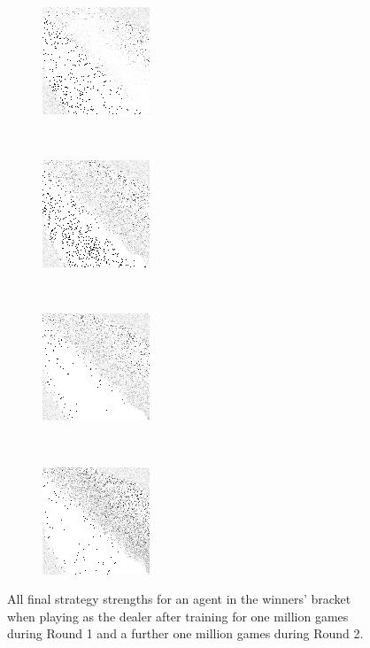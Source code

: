 \begin{figure}
	\begin{subfigure}[t]{0.22\textwidth}
		\includegraphics[width=\stratgraphwidth]{images/findings/round2/strats/winner/crib_min_avg.png}
		\caption{\cribminavg}
	\end{subfigure}
	~
	\begin{subfigure}[t]{0.22\textwidth}
		\includegraphics[width=\stratgraphwidth]{images/findings/round2/strats/winner/pegging_max_avg_gained.png}
		\caption{\peggingmaxavggained}
	\end{subfigure}
	~
	\begin{subfigure}[t]{0.22\textwidth}
		\includegraphics[width=\stratgraphwidth]{images/findings/round2/strats/winner/pegging_max_med_gained.png}
		\caption{\peggingmaxmedgained}
	\end{subfigure}
	~
	\begin{subfigure}[t]{0.22\textwidth}
		\includegraphics[width=\stratgraphwidth]{images/findings/round2/strats/winner/pegging_min_avg_given.png}
		\caption{\peggingminavggiven}
	\end{subfigure}

\caption{
	All final strategy strengths for an agent in the winners' bracket
	when playing as the dealer
	after training for one million games during Round 1
	and a further one million games during Round 2.
}
\label{fig:r2-strats-winner}
\end{figure}
